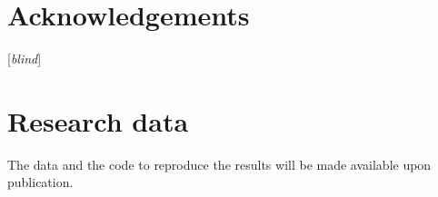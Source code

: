 \documentclass[review, doubleblind, 3p,
authoryear]{elsarticle} %
\begin{document}
\section*{Acknowledgements}\label{acknowledgements}

{[}\emph{blind}{]}

\section*{Research data}\label{research-data}

The data and the code to reproduce the results will be made available
upon publication.

\renewcommand\refname{References}

\end{document}
